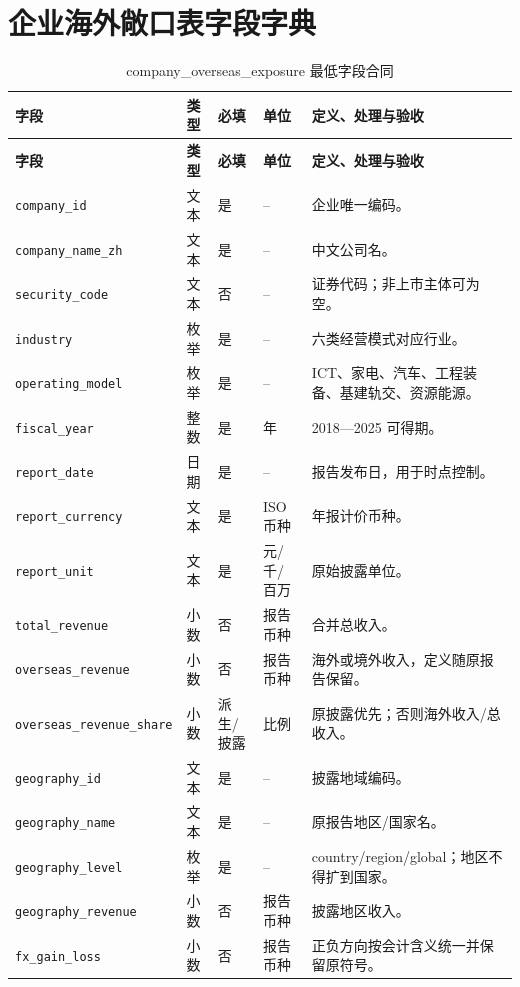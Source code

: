 \documentclass[UTF8,fontset=windows,12pt,openany]{ctexbook}
\newcommand{\Field}[1]{{\small\nolinkurl{#1}}}
\begin{document}
\chapter{企业海外敞口表字段字典}
\clearpage
\begin{landscape}
\begin{longtable}{p{4.2cm}p{2.2cm}p{2.3cm}p{2.7cm}p{7.0cm}}
\caption{company\_overseas\_exposure 最低字段合同}\label{tab:dict-company}\\
\toprule
\textbf{字段} & \textbf{类型} & \textbf{必填} & \textbf{单位} & \textbf{定义、处理与验收}\\
\midrule
\endfirsthead
\toprule \textbf{字段} & \textbf{类型} & \textbf{必填} & \textbf{单位} & \textbf{定义、处理与验收}\\ \midrule
\endhead
\Field{company_id} & 文本 & 是 & -- & 企业唯一编码。\\
\Field{company_name_zh} & 文本 & 是 & -- & 中文公司名。\\
\Field{security_code} & 文本 & 否 & -- & 证券代码；非上市主体可为空。\\
\Field{industry} & 枚举 & 是 & -- & 六类经营模式对应行业。\\
\Field{operating_model} & 枚举 & 是 & -- & ICT、家电、汽车、工程装备、基建轨交、资源能源。\\
\Field{fiscal_year} & 整数 & 是 & 年 & 2018—2025 可得期。\\
\Field{report_date} & 日期 & 是 & -- & 报告发布日，用于时点控制。\\
\Field{report_currency} & 文本 & 是 & ISO 币种 & 年报计价币种。\\
\Field{report_unit} & 文本 & 是 & 元/千/百万 & 原始披露单位。\\
\Field{total_revenue} & 小数 & 否 & 报告币种 & 合并总收入。\\
\Field{overseas_revenue} & 小数 & 否 & 报告币种 & 海外或境外收入，定义随原报告保留。\\
\Field{overseas_revenue_share} & 小数 & 派生/披露 & 比例 & 原披露优先；否则海外收入/总收入。\\
\Field{geography_id} & 文本 & 是 & -- & 披露地域编码。\\
\Field{geography_name} & 文本 & 是 & -- & 原报告地区/国家名。\\
\Field{geography_level} & 枚举 & 是 & -- & country/region/global；地区不得扩到国家。\\
\Field{geography_revenue} & 小数 & 否 & 报告币种 & 披露地区收入。\\
\Field{fx_gain_loss} & 小数 & 否 & 报告币种 & 正负方向按会计含义统一并保留原符号。\\

\end{longtable}
\end{landscape}
\end{document}
